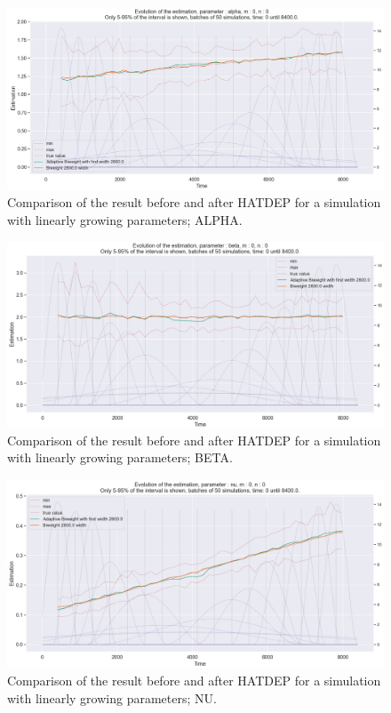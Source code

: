 \begin{figure}
\centering
\includegraphics[width = 0.90 \textwidth]{../imag/chap3/1/D.png}
\caption{Comparison of the result before and after HATDEP for a simulation with linearly growing parameters; ALPHA.}
\label{fig:first_estimate_1_alpha}
\end{figure}

\begin{figure}
\centering
\includegraphics[width = 0.90 \textwidth]{../imag/chap3/1/E.png}
\caption{Comparison of the result before and after HATDEP for a simulation with linearly growing parameters; BETA.}
\label{fig:first_estimate_1_beta}
\end{figure}

\begin{figure}
\centering
\includegraphics[width = 0.90 \textwidth]{../imag/chap3/1/F.png}
\caption{Comparison of the result before and after HATDEP for a simulation with linearly growing parameters; NU.}
\label{fig:first_estimate_1_nu}
\end{figure}

















